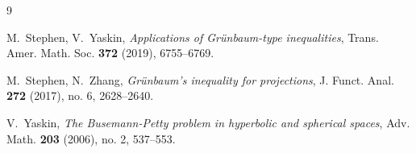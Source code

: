 \documentclass[12pt,letterpaper,reqno]{amsart}
\theoremstyle{definition}
\begin{document}
\begin{thebibliography}{9}
					
							M.~Stephen, V.~Yaskin, {\em Applications of Gr\"unbaum-type inequalities},  Trans. Amer. Math. Soc. {\bf 372} (2019), 6755--6769.
				
						 {M.~Stephen, N.~Zhang}, {\em Gr\"unbaum's inequality for projections}, J. Funct. Anal. \textbf{272} (2017), no. 6, 2628--2640.
				
				
				
				
				
				
		
		
 V.~Yaskin, {\em The Busemann-Petty problem in hyperbolic and spherical spaces},
Adv. Math. {\bf 203} (2006), no. 2, 537--553.
	
 
\end{thebibliography}
\end{document}
